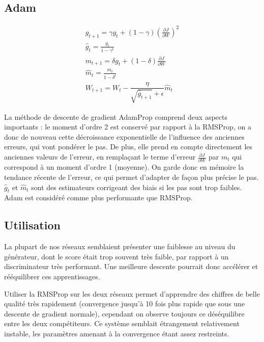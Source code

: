 \subsection{Adam}

\begin{equation} 
\begin{aligned}
g_{t+1} = \gamma g_t + (1-\gamma)(\frac{\partial J}{\partial W})^2  \\
\hat{g}_{t} = \frac{g_{t} }{1 - \gamma^t} \\
m_{t+1} = \delta g_t + (1-\delta)\frac{\partial J}{\partial W}   \\
\hat{m}_{t} = \frac{m_{t} }{1 - \delta^t} \\
W_{t+1} = W_t - \dfrac{\eta}{\sqrt{\hat{g}_{t+1}} + \epsilon}\hat{m}_{t}
\end{aligned}
\end{equation} 

La méthode de descente de gradient AdamProp comprend deux aspects importants : le moment d'ordre 2 est conservé par rapport à la RMSProp, on a donc de nouveau cette décroissance exponentielle de l'influence des anciennes erreurs, qui vont pondérer le pas. De plus, elle prend en compte directement les anciennes valeurs de l'erreur, en remplaçant le terme d'erreur $\frac{\partial J}{\partial W}$ par $m_{t}$ qui correspond à un moment d'ordre 1 (moyenne). On garde donc en mémoire la tendance récente de l'erreur, ce qui permet d'adapter de façon plus précise le pas.
$\hat{g}_{t}$ et $\hat{m}_{t}$ sont des estimateurs corrigeant des  biais si les pas sont trop faibles.
Adam est considéré comme plus performante que RMSProp. 

\subsection{Utilisation}

La plupart de nos réseaux semblaient présenter une faiblesse au niveau du générateur, dont le score était trop souvent très faible, par rapport à un discriminateur très performant. Une meilleure descente pourrait donc accélérer et rééquilibrer ces apprentissages. 

Utiliser la RMSProp sur les deux réseaux permet d'apprendre des chiffres de belle qualité très rapidement (convergence jusqu'à 10 fois plus rapide que sous une descente de gradient normale), cependant on observe toujours ce déséquilibre entre les deux compétiteurs. Ce système semblait étrangement relativement instable, les paramètres amenant à la convergence étant assez restreints.

